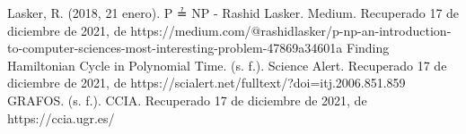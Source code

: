 \documentclass{article}
\begin{document}
    
   
\newpage    
        
\begin{thebibliography}{}
    
        Lasker, R. (2018, 21 enero). P ≟ NP - Rashid Lasker. Medium. Recuperado 17 de diciembre de 2021, de https://medium.com/@rashidlasker/p-np-an-introduction-to-computer-sciences-most-interesting-problem-47869a34601a
        Finding Hamiltonian Cycle in Polynomial Time. (s. f.). Science Alert. Recuperado 17 de diciembre de 2021, de https://scialert.net/fulltext/?doi=itj.2006.851.859
        GRAFOS. (s. f.). CCIA. Recuperado 17 de diciembre de 2021, de https://ccia.ugr.es/%
        
    \end{thebibliography}
\end{document}
